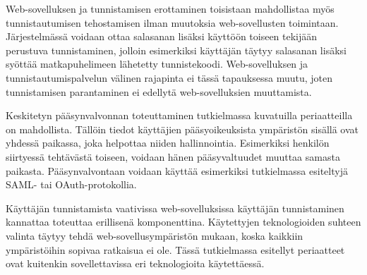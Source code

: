 Web-sovelluksen ja tunnistamisen erottaminen toisistaan mahdollistaa myös tunnistautumisen tehostamisen ilman muutoksia web-sovellusten toimintaan. Järjestelmässä voidaan ottaa salasanan lisäksi käyttöön toiseen tekijään perustuva tunnistaminen, jolloin esimerkiksi käyttäjän täytyy salasanan lisäksi syöttää matkapuhelimeen lähetetty tunnistekoodi. Web-sovelluksen ja tunnistautumispalvelun välinen rajapinta ei tässä tapauksessa muutu, joten tunnistamisen parantaminen ei edellytä web-sovelluksien muuttamista.

Keskitetyn pääsynvalvonnan toteuttaminen tutkielmassa kuvatuilla periaatteilla on mahdollista. Tällöin tiedot käyttäjien pääsyoikeuksista ympäristön sisällä ovat yhdessä paikassa, joka helpottaa niiden hallinnointia. Esimerkiksi henkilön siirtyessä tehtävästä toiseen, voidaan hänen pääsyvaltuudet muuttaa samasta paikasta. Pääsynvalvontaan voidaan käyttää esimerkiksi tutkielmassa esiteltyjä SAML- tai OAuth-protokollia.

Käyttäjän tunnistamista vaativissa web-sovelluksissa käyttäjän tunnistaminen kannattaa toteuttaa erillisenä komponenttina. Käytettyjen teknologioiden suhteen valinta täytyy tehdä web-sovellusympäristön mukaan, koska kaikkiin ympäristöihin sopivaa ratkaisua ei ole. Tässä tutkielmassa esitellyt periaatteet ovat kuitenkin sovellettavissa eri teknologioita käytettäessä.